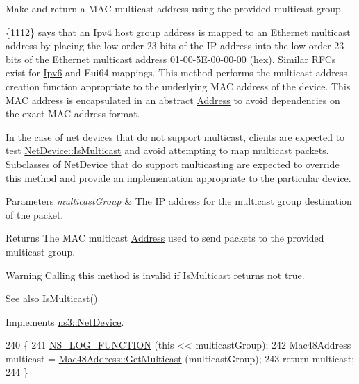 Make and return a M\+AC multicast address using the provided multicast group. 

\{1112\} says that an \hyperlink{classns3_1_1Ipv4}{Ipv4} host group address is mapped to an Ethernet multicast address by placing the low-\/order 23-\/bits of the IP address into the low-\/order 23 bits of the Ethernet multicast address 01-\/00-\/5\+E-\/00-\/00-\/00 (hex). Similar R\+F\+Cs exist for \hyperlink{classns3_1_1Ipv6}{Ipv6} and Eui64 mappings. This method performs the multicast address creation function appropriate to the underlying M\+AC address of the device. This M\+AC address is encapsulated in an abstract \hyperlink{classns3_1_1Address}{Address} to avoid dependencies on the exact M\+AC address format.

In the case of net devices that do not support multicast, clients are expected to test \hyperlink{classns3_1_1NetDevice_a1afb4848a9226540f1ff51f9b31ae95e}{Net\+Device\+::\+Is\+Multicast} and avoid attempting to map multicast packets. Subclasses of \hyperlink{classns3_1_1NetDevice}{Net\+Device} that do support multicasting are expected to override this method and provide an implementation appropriate to the particular device.


\begin{DoxyParams}{Parameters}
{\em multicast\+Group} & The IP address for the multicast group destination of the packet. \\
\hline
\end{DoxyParams}
\begin{DoxyReturn}{Returns}
The M\+AC multicast \hyperlink{classns3_1_1Address}{Address} used to send packets to the provided multicast group.
\end{DoxyReturn}
\begin{DoxyWarning}{Warning}
Calling this method is invalid if Is\+Multicast returns not true. 
\end{DoxyWarning}
\begin{DoxySeeAlso}{See also}
\hyperlink{classns3_1_1MeshPointDevice_af2d877953e96024612cf665780a2422b}{Is\+Multicast()} 
\end{DoxySeeAlso}


Implements \hyperlink{classns3_1_1NetDevice_a98aa4852df367b6a393c8cc1d88af0d9}{ns3\+::\+Net\+Device}.


\begin{DoxyCode}
240 \{
241   \hyperlink{log-macros-disabled_8h_a90b90d5bad1f39cb1b64923ea94c0761}{NS\_LOG\_FUNCTION} (\textcolor{keyword}{this} << multicastGroup);
242   Mac48Address multicast = \hyperlink{classns3_1_1Mac48Address_a23d170f8c7a7d90a8110425620285819}{Mac48Address::GetMulticast} (multicastGroup);
243   \textcolor{keywordflow}{return} multicast;
244 \}
\end{DoxyCode}


